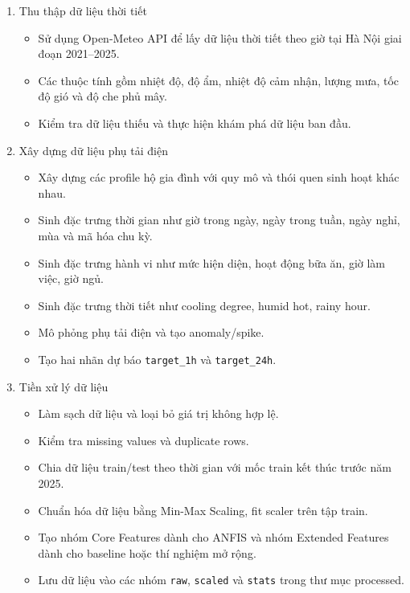 \begin{enumerate}[leftmargin=1.2cm]
  \item Thu thập dữ liệu thời tiết
  \begin{itemize}
    \item Sử dụng Open-Meteo API để lấy dữ liệu thời tiết theo giờ tại Hà Nội giai đoạn 2021--2025.
    \item Các thuộc tính gồm nhiệt độ, độ ẩm, nhiệt độ cảm nhận, lượng mưa, tốc độ gió và độ che phủ mây.
    \item Kiểm tra dữ liệu thiếu và thực hiện khám phá dữ liệu ban đầu.
  \end{itemize}

  \item Xây dựng dữ liệu phụ tải điện
  \begin{itemize}
    \item Xây dựng các profile hộ gia đình với quy mô và thói quen sinh hoạt khác nhau.
    \item Sinh đặc trưng thời gian như giờ trong ngày, ngày trong tuần, ngày nghỉ, mùa và mã hóa chu kỳ.
    \item Sinh đặc trưng hành vi như mức hiện diện, hoạt động bữa ăn, giờ làm việc, giờ ngủ.
    \item Sinh đặc trưng thời tiết như cooling degree, humid hot, rainy hour.
    \item Mô phỏng phụ tải điện và tạo anomaly/spike.
    \item Tạo hai nhãn dự báo \texttt{target\_1h} và \texttt{target\_24h}.
  \end{itemize}

  \item Tiền xử lý dữ liệu
  \begin{itemize}
    \item Làm sạch dữ liệu và loại bỏ giá trị không hợp lệ.
    \item Kiểm tra missing values và duplicate rows.
    \item Chia dữ liệu train/test theo thời gian với mốc train kết thúc trước năm 2025.
    \item Chuẩn hóa dữ liệu bằng Min-Max Scaling, fit scaler trên tập train.
    \item Tạo nhóm Core Features dành cho ANFIS và nhóm Extended Features dành cho baseline hoặc thí nghiệm mở rộng.
    \item Lưu dữ liệu vào các nhóm \texttt{raw}, \texttt{scaled} và \texttt{stats} trong thư mục processed.
  \end{itemize}


\end{enumerate}
